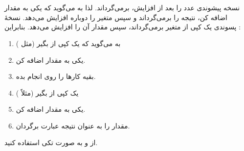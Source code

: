 \section{}
\paragraph{}\label{answer:87}
نسخه پیشوندی \lr{\texttt{++}} عدد را بعد از افزایش، برمی‌گرداند. لذا  به  می‌گوید که یکی به مقدار  اضافه کن، نتیجه را برمی‌گرداند و سپس متغیر  را دوباره افزایش می‌دهد. نسخهٔ پسوندی  یک کپی از متغیر برمی‌گرداند، سپس مقدار آن را افزایش می‌دهد. بنابراین :
\begin{enumerate}
    \item به  می‌گوید که یک کپی از  بگیر (مثل )
    \item یکی به مقدار  اضافه کن.
    \item بقیه کارها را روی  انجام بده.
    \item یک کپی از  بگیر (مثلاً )
    \item یکی به مقدار  اضافه کن.
    \item مقدار  را به عنوان نتیجه عبارت برگردان.
\end{enumerate}

از \lr{\texttt{++}} و \lr{\texttt{--}} به صورت تکی استفاده کنید.